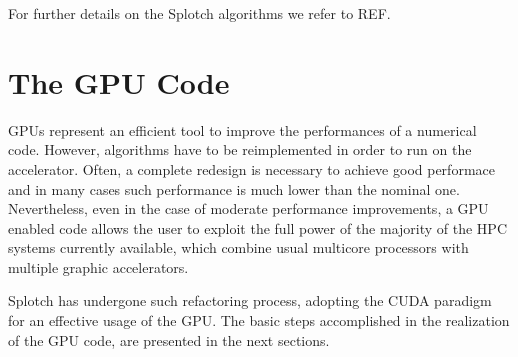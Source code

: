 \documentclass[11pt]{article}
\begin{document}
For further details on the Splotch algorithms we refer to REF.

\section{The GPU Code}

GPUs represent an efficient tool to improve the performances of a numerical code.
However, algorithms have to be reimplemented in order to run on the accelerator. 
Often, a complete redesign is necessary to achieve good performace and in many
cases such performance is much lower than the nominal one. Nevertheless, even in 
the case of moderate performance improvements, a GPU enabled code allows the 
user to exploit the full power of the majority of the HPC systems currently 
available, which combine usual multicore processors with multiple graphic accelerators.

Splotch has undergone such refactoring process, adopting the CUDA paradigm 
for an effective usage of the GPU. The basic steps accomplished in
the realization of the GPU code, are presented in the next sections. 

%
\end{document}
